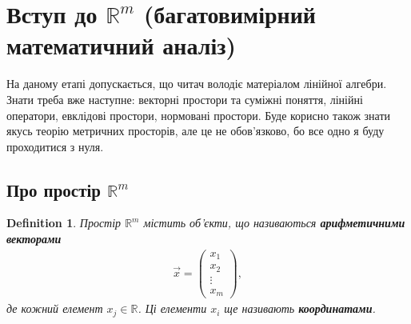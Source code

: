 \documentclass[a4paper, 10pt]{article}
\theoremstyle{theoremdd}
\theoremstyle{theoremdd}
\theoremstyle{theoremdd}
\newtheorem{definition}[theorem]{Definition}
\theoremstyle{theoremdd}
\theoremstyle{theoremdd}
\theoremstyle{theoremdd}
\theoremstyle{theoremdd}
\theoremstyle{theoremdd}
\theoremstyle{theoremdd}
\begin{document}
\newpage
\section{Вступ до $\mathbb{R}^m$ (багатовимірний математичний аналіз)}
На даному етапі допускається, що читач володіє матеріалом лінійної алгебри. Знати треба вже наступне: векторні простори та суміжні поняття, лінійні оператори, евклідові простори, нормовані простори. Буде корисно також знати якусь теорію метричних просторів, але це не обов'язково, бо все одно я буду проходитися з нуля.

\subsection{Про простір $\mathbb{R}^m$}
\begin{definition}
Простір $\mathbb{R}^m$ містить об'єкти, що називаються \textbf{арифметичними векторами}
\begin{align*}
\vec{x} = \begin{pmatrix}
x_1 \\ x_2 \\ \vdots \\ x_m
\end{pmatrix},
\end{align*}
де кожний елемент $x_j \in \mathbb{R}$. Ці елементи $x_i$ ще називають \textbf{координатами}.
\end{definition}
\end{document}
